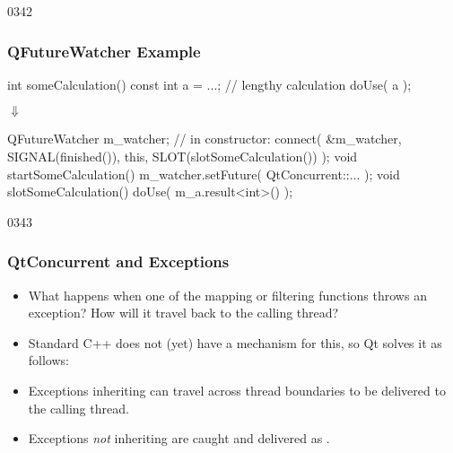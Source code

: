 \begin{slide}[fragile]{0342}
\frametitle{QFutureWatcher Example}
\begin{center}\footnotesize
\begin{cpp}
int someCalculation() {
  const int a = ...; // lengthy calculation
  doUse( a );
}
\end{cpp}
{\Huge$\Downarrow$}
\begin{cpp}
QFutureWatcher m_watcher;
// in constructor:
connect( &m_watcher, SIGNAL(finished()),
         this, SLOT(slotSomeCalculation()) );
void startSomeCalculation() {
  m_watcher.setFuture( QtConcurrent::... );
}
void slotSomeCalculation() {
  doUse( m_a.result<int>() );
}
\end{cpp}
\end{center}
\end{slide}
\begin{slide}[fragile]{0343}
\frametitle{QtConcurrent and Exceptions}
  \begin{itemize}
  \item What happens when one of the mapping or filtering functions
    throws an exception? How will it travel back to the calling
    thread?
  \item Standard C++ does not (yet) have a mechanism for this, so Qt
    solves it as follows:
  \item Exceptions inheriting  can
    travel across thread boundaries to be delivered to the calling
    thread.
  \item Exceptions \emph{not} inheriting
     are caught and delivered as
    .
  \end{itemize}
\end{slide}

